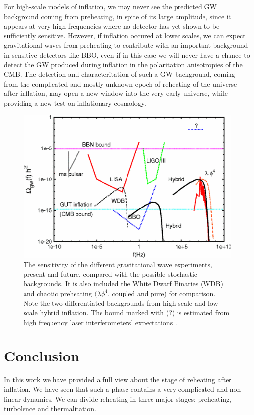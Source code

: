 \documentclass[11pt,a4paper,twoside]{book}
\begin{document}
For high-scale models of inflation, we may never  see the predicted GW background coming from preheating, in spite of its large amplitude, since it appears at very high frequencies where no detector has yet shown to be sufficiently sensitive. However, if inflation occured at lower scales, we can expect gravitational waves from preheating to contribute with an important background in sensitive detectors like BBO, even if in this case we will never have a chance to detect the GW produced during inflation in the polaritation anisotropies of the CMB. The detection  and characteritation of such a GW background, coming from the complicated and mostly unknown epoch of reheating of the universe after inflation, may open a new window into the very early universe, while providing a new test on inflationary cosmology.

\begin{figure}
	\centering
	\includegraphics[width=0.8\linewidth, height=0.4\textheight]{Images/Chap7/Hybrid_Fig10}
	\caption{The sensitivity of the different gravitational wave experiments, present and future, compared with the possible stochastic backgrounds. It is also included the White Dwarf Binaries (WDB) and chaotic preheating $ (\lambda \phi^{4} $, coupled and pure) for comparison. Note the two differentiated backgrounds from high-scale and low-scale hybrid inflation. The bound marked with (?) is estimated from high frequency laser interferometers' expectations \cite{Chap7:HybridModel}.}
	\label{fig:hybridfig10}
\end{figure}



\chapter*{Conclusion}
In  this work we have provided a full view about the stage of reheating after inflation. We have seen that such a phase contains a very complicated and non-linear dynamics. We can divide reheating in three major stages: preheating, turbolence and thermalitation.
\end{document}
